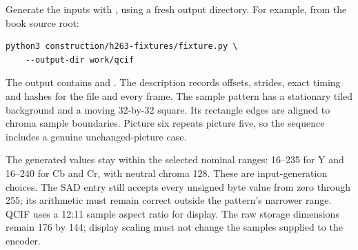 Generate the inputs with
, using a fresh output directory. For example, from the book source root:
\begin{verbatim}
python3 construction/h263-fixtures/fixture.py \
    --output-dir work/qcif
\end{verbatim}
The output
contains  and . The description records offsets,
strides, exact timing and hashes for the file and every frame. The sample pattern
has a stationary tiled background and a moving 32-by-32 square. Its rectangle
edges are aligned to chroma sample boundaries. Picture six repeats picture five,
so the sequence includes a genuine unchanged-picture case.

The generated values stay within the selected nominal ranges: 16--235 for Y and
16--240 for Cb and Cr, with neutral chroma 128. These are input-generation choices.
The SAD entry still accepts every unsigned byte value from zero through 255; its
arithmetic must remain correct outside the pattern's narrower range. QCIF uses a
12:11 sample aspect ratio for display. The raw storage dimensions remain 176 by
144; display scaling must not change the samples supplied to the encoder.
